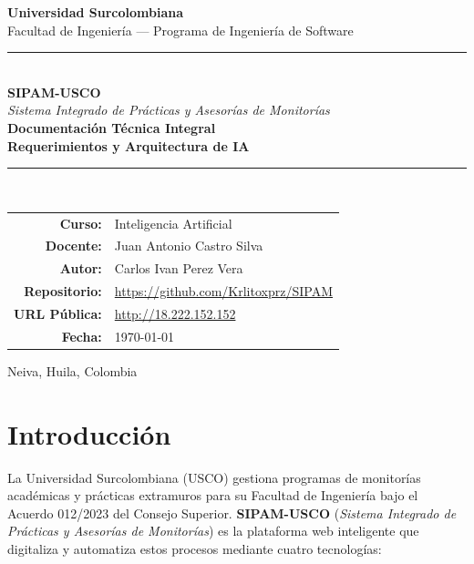 \documentclass[12pt,a4paper,twoside]{report}
\begin{document}

\begin{titlepage}
\centering\vspace*{0.8cm}
{\LARGE\bfseries\textcolor{uscoRed}{Universidad Surcolombiana}}\\[0.2cm]
{\large Facultad de Ingeniería — Programa de Ingeniería de Software}\\[1.4cm]
\textcolor{uscoRed}{\rule{\textwidth}{2.5pt}}\\[0.6cm]
{\fontsize{26}{30}\selectfont\bfseries\textcolor{uscoRed}{SIPAM-USCO}}\\[0.3cm]
{\large\itshape Sistema Integrado de Prácticas y Asesorías de Monitorías}\\[0.4cm]
{\LARGE\bfseries Documentación Técnica Integral\\Requerimientos y Arquitectura de IA}\\[0.6cm]
\textcolor{uscoRed}{\rule{\textwidth}{2.5pt}}\\[1.5cm]
\begin{tabular}{@{}rl@{}}
  \textbf{Curso:}       & Inteligencia Artificial \\[0.35cm]
  \textbf{Docente:}     & Juan Antonio Castro Silva \\[0.35cm]
  \textbf{Autor:}       & Carlos Ivan Perez Vera \\[0.35cm]
  \textbf{Repositorio:} & \url{https://github.com/Krlitoxprz/SIPAM} \\[0.35cm]
  \textbf{URL Pública:} & \url{http://18.222.152.152} \\[0.35cm]
  \textbf{Fecha:}       & \today \\
\end{tabular}
\vfill
{\large Neiva, Huila, Colombia}
\end{titlepage}

\tableofcontents\newpage
\listoffigures\newpage
\listoftables\newpage

\chapter{Introducción}

La Universidad Surcolombiana (USCO) gestiona programas de monitorías académicas y prácticas
extramuros para su Facultad de Ingeniería bajo el Acuerdo 012/2023 del Consejo Superior.
\textbf{SIPAM-USCO} (\textit{Sistema Integrado de Prácticas y Asesorías de Monitorías}) es la
plataforma web inteligente que digitaliza y automatiza estos procesos mediante cuatro tecnologías:
\end{document}
